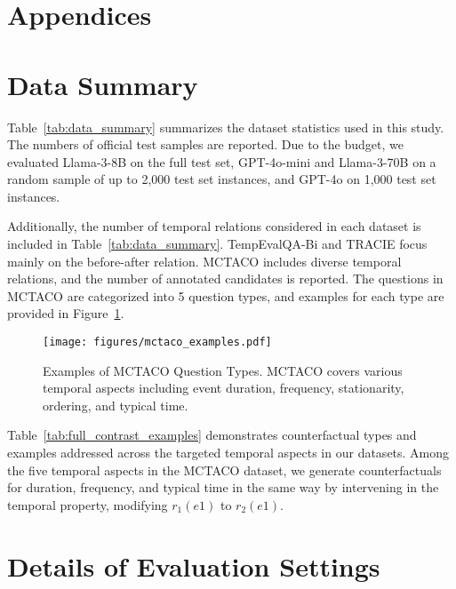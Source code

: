 \newpage
\section*{\centering Appendices}




\section{Data Summary}
\label{appndx:data_summary}
Table~\ref{tab:data_summary} summarizes the dataset statistics used in this study. The numbers of official test samples are reported. 
Due to the budget, we evaluated Llama-3-8B on the full test set, GPT-4o-mini and Llama-3-70B on a random sample of up to 2,000 test set instances, and GPT-4o on 1,000 test set instances.

Additionally, the number of temporal relations considered in each dataset is included in Table~\ref{tab:data_summary}. TempEvalQA-Bi and TRACIE focus mainly on the before-after relation. MCTACO includes diverse temporal relations, and the number of annotated candidates is reported.
The questions in MCTACO are categorized into 5 question types, and examples for each type are provided in Figure~\ref{fig:mctaco_examples}.




\begin{figure}[h]
    \centering
    \texttt{[image: figures/mctaco\_examples.pdf]}
    \caption{Examples of MCTACO Question Types. MCTACO covers various temporal aspects including event duration, frequency, stationarity, ordering, and typical time.}
    \label{fig:mctaco_examples}
\end{figure}

Table~\ref{tab:full_contrast_examples} demonstrates counterfactual types and examples addressed across the targeted temporal aspects in our datasets.
Among the five temporal aspects in the MCTACO dataset, we generate counterfactuals for duration, frequency, and typical time in the same way by intervening in the temporal property, modifying $r_1(e1)$ to $r_2(e1)$.

\section{Details of Evaluation Settings}
\label{appndx:hyperparam}

